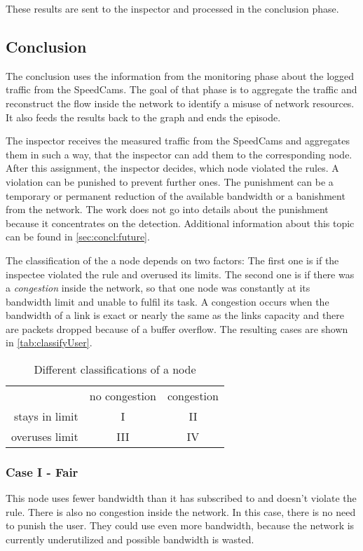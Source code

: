 \documentclass[thesis.tex]{subfiles}
\begin{document}
These results are sent to the inspector and processed in the conclusion phase.

\subsection{Conclusion} \label{sec:main:conclusionphase}
The conclusion uses the information from the monitoring phase about the logged traffic from the SpeedCams. The goal of that phase is to aggregate the traffic and reconstruct the flow inside the network to identify a misuse of network resources. It also feeds the results back to the graph and ends the episode.

The inspector receives the measured traffic from the SpeedCams and aggregates them in such a way, that the inspector can add them to the corresponding node. After this assignment, the inspector decides, which node violated the rules. A violation can be punished to prevent further ones. The punishment can be a temporary or permanent reduction of the available bandwidth or a banishment from the network. The work does not go into details about the punishment because it concentrates on the detection. Additional information about this topic can be found in \autoref{sec:concl:future}.

The classification of the a node depends on two factors: The first one is if the inspectee violated the rule and overused its limits. The second one is if there was a \textit{congestion} inside the network, so that one node was constantly at its bandwidth limit and unable to fulfil its task. A congestion occurs when the bandwidth of a link is exact or nearly the same as the links capacity and there are packets dropped because of a buffer overflow. The resulting cases are shown in \autoref{tab:classifyUser}.
\begin{table}[!h]
    \centering
    \begin{tabular}{ r|c|c| }
        \multicolumn{1}{r}{}
        &  \multicolumn{1}{c}{no congestion}
        & \multicolumn{1}{c}{congestion} \\
        \cline{2-3}
        stays in limit & I & II \\
        \cline{2-3}
        overuses limit & III & IV \\
        \cline{2-3}
    \end{tabular}
    \caption{Different classifications of a node}
    \label{tab:classifyUser}    
\end{table}

\subsubsection{Case I - Fair} \label{sub:main:detection:case1}
This node uses fewer bandwidth than it has subscribed to and doesn't violate the rule. There is also no congestion inside the network. In this case, there is no need to punish the user. They could use even more bandwidth, because the network is currently underutilized and possible bandwidth is wasted.
\end{document}
